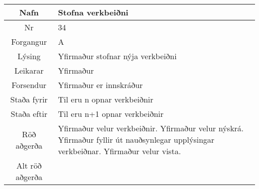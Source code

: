 \documentclass[a4paper]{article}
\begin{document}
\begin{tabular}{|c|p{10cm}|}
\hline
Nafn&Stofna verkbeiðni\\
\hline
Nr&34\\
\hline
Forgangur&A\\
\hline
Lýsing&Yfirmaður stofnar nýja verkbeiðni\\
\hline
Leikarar&Yfirmaður\\
\hline
Forsendur&Yfirmaður er innskráður\\
\hline
Staða fyrir&Til eru n opnar verkbeiðnir\\
\hline
Staða eftir&Til eru n+1 opnar verkbeiðnir\\
\hline
Röð aðgerða&Yfirmaður velur verkbeiðnir. Yfirmaður velur nýskrá. Yfirmaður fyllir út nauðsynlegar upplýsingar verkbeiðnar. Yfirmaður velur vista.\\
\hline
Alt röð aðgerða&\\
\hline
\end{tabular}
\end{document}
